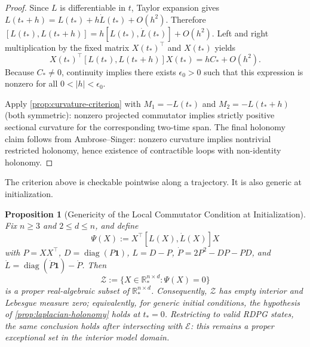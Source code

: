 \documentclass{article}
\newcommand{\RR}{\mathbb{R}}
\DeclareMathOperator{\diag}{diag}
\theoremstyle{plain}
\newtheorem{proposition}{Proposition}
\theoremstyle{definition}
\theoremstyle{remark}
\begin{document}
\begin{proof}
Since $L$ is differentiable in $t$, Taylor expansion gives
$L(t_* + h) = L(t_*) + h \dot{L}(t_*) + O(h^2)$.
Therefore
$[L(t_*), L(t_* + h)] = h [L(t_*), \dot{L}(t_*)] + O(h^2)$.
Left and right multiplication by the fixed matrix $X(t_*)^\top$ and $X(t_*)$ yields
\begin{equation}
X(t_*)^\top [L(t_*), L(t_* + h)] X(t_*) = h C_* + O(h^2).
\end{equation}
Because $C_* \neq 0$, continuity implies there exists $\epsilon_0 > 0$ such that this expression is nonzero for all $0 < |h| < \epsilon_0$.

Apply \cref{prop:curvature-criterion} with $M_1 = -L(t_*)$ and $M_2 = -L(t_* + h)$ (both symmetric): nonzero projected commutator implies strictly positive sectional curvature for the corresponding two-time span.
The final holonomy claim follows from Ambrose--Singer: nonzero curvature implies nontrivial restricted holonomy, hence existence of contractible loops with non-identity holonomy.
\end{proof}

The criterion above is checkable pointwise along a trajectory. It is also generic at initialization.

\begin{proposition}[Genericity of the Local Commutator Condition at Initialization]\label{prop:laplacian-generic-init}
Fix $n \ge 3$ and $2 \le d \le n$, and define
\begin{equation}
\Psi(X) := X^\top [L(X), \dot{L}(X)] X
\end{equation}
with $P = XX^\top$, $D = \diag(P\mathbf{1})$, $L = D - P$, $\dot{P} = 2P^2 - DP - PD$, and $\dot{L} = \diag(\dot{P}\mathbf{1}) - \dot{P}$.
Then
\begin{equation}
\mathcal{Z} := \{X \in \RR_*^{n \times d} : \Psi(X) = 0\}
\end{equation}
is a proper real-algebraic subset of $\RR_*^{n \times d}$.
Consequently, $\mathcal{Z}$ has empty interior and Lebesgue measure zero; equivalently, for generic initial conditions, the hypothesis of \cref{prop:laplacian-holonomy} holds at $t_* = 0$.
Restricting to valid RDPG states, the same conclusion holds after intersecting with $\mathcal{E}$: this remains a proper exceptional set in the interior model domain.
\end{proposition}
\end{document}
